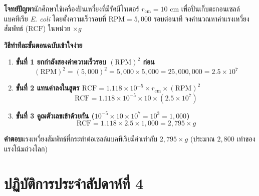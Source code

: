 \begin{worked}
\textbf{โจทย์ปัญหา}\quad นักศึกษาใช้เครื่องปั่นเหวี่ยงที่มีรัศมีโรเตอร์ $r_{\text{cm}} = 10\text{ cm}$ เพื่อปั่นเก็บตะกอนเซลล์แบคทีเรีย \textit{E. coli} โดยตั้งความเร็วรอบที่ $\text{RPM} = 5{,}000\text{ รอบต่อนาที}$ จงคำนวณหาค่าแรงเหวี่ยงสัมพัทธ์ ($\text{RCF}$) ในหน่วย $\times g$

\textbf{วิธีทำทีละขั้นตอนฉบับเข้าใจง่าย}
\begin{enumerate}
    \item \textbf{ขั้นที่ 1 ยกกำลังสองค่าความเร็วรอบ $(\text{RPM})^2$ ก่อน}
    \[
        (\text{RPM})^2 = (5{,}000)^2 = 5{,}000 \times 5{,}000 = 25{,}000{,}000 = 2.5 \times 10^7
    \]
    \item \textbf{ขั้นที่ 2 แทนค่าลงในสูตร $\text{RCF} = 1.118 \times 10^{-5} \times r_{\text{cm}} \times (\text{RPM})^2$}
    \[
        \text{RCF} = 1.118 \times 10^{-5} \times 10 \times (2.5 \times 10^7)
    \]
    \item \textbf{ขั้นที่ 3 คูณตัวเลขเข้าด้วยกัน ($10^{-5} \times 10 \times 10^7 = 10^3 = 1{,}000$)}
    \[
        \text{RCF} = 1.118 \times 2.5 \times 1{,}000 = 2{,}795 \times g
    \]
\end{enumerate}
\textbf{คำตอบ}\quad แรงเหวี่ยงสัมพัทธ์ที่กระทำต่อเซลล์แบคทีเรียมีค่าเท่ากับ $2{,}795 \times g$ (ประมาณ $2{,}800$ เท่าของแรงโน้มถ่วงโลก)
\end{worked}

\section{ปฏิบัติการประจำสัปดาห์ที่ 4}

